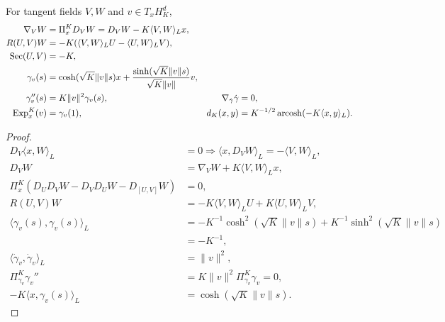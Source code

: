 \begin{proposition}
For tangent fields $V,W$ and $v\in T_xH_K^d$,
\begin{align}
 \nabla_VW&=\Pi_x^KD_VW=D_VW-K\langle V,W\rangle_Lx,\\
 R(U,V)W&=-K(\langle V,W\rangle_LU-\langle U,W\rangle_LV),\\
 \operatorname{Sec}(U,V)&=-K,\\
 \gamma_v(s)&=\cosh(\sqrt K\|v\|s)x+
 \frac{\sinh(\sqrt K\|v\|s)}{\sqrt K\|v\|}v,\\
 \gamma_v''(s)&=K\|v\|^2\gamma_v(s),&
 \nabla_{\dot\gamma}\dot\gamma&=0,\\
 \operatorname{Exp}_x^K(v)&=\gamma_v(1),&
 d_K(x,y)&=K^{-1/2}\operatorname{arcosh}(-K\langle x,y\rangle_L).
\end{align}
\end{proposition}
\begin{proof}
\begin{align}
 D_V\langle x,W\rangle_L&=0
 \Longrightarrow\langle x,D_VW\rangle_L=-\langle V,W\rangle_L,\\
 D_VW&=\nabla_VW+K\langle V,W\rangle_Lx,\\
 \Pi_x^K(D_UD_VW-D_VD_UW-D_{[U,V]}W)&=0,\\
 R(U,V)W
 &=-K\langle V,W\rangle_LU+K\langle U,W\rangle_LV,\\
 \langle\gamma_v(s),\gamma_v(s)\rangle_L
 &=-K^{-1}\cosh^2(\sqrt K\|v\|s)
   +K^{-1}\sinh^2(\sqrt K\|v\|s)\\
 &=-K^{-1},\\
 \langle\dot\gamma_v,\dot\gamma_v\rangle_L&=\|v\|^2,\\
 \Pi_{\gamma_v}^K\gamma_v''&=K\|v\|^2\Pi_{\gamma_v}^K\gamma_v=0,\\
 -K\langle x,\gamma_v(s)\rangle_L&=\cosh(\sqrt K\|v\|s).
\end{align}
\end{proof}

